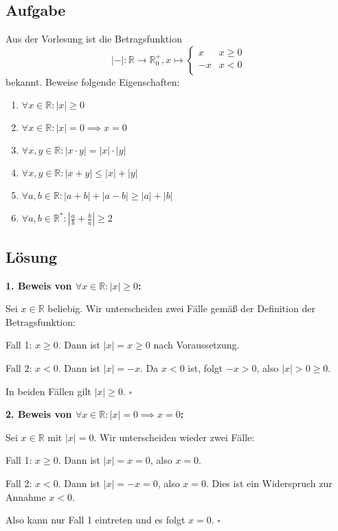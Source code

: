 \documentclass{article}
\newcommand{\abs}[1]{|#1|}
\newcommand{\R}{\mathbb{R}}
\newcommand{\fa}[1]{\forall #1 \colon}
\begin{document}
\subsection*{Aufgabe}
Aus der Vorlesung ist die Betragsfunktion 
\[
  \abs{{-}} \colon \R \to \R^{+}_{0}, x \mapsto
  \begin{cases}
    x  & x \geq 0 \\
    -x & x < 0    \\
  \end{cases}
\]
bekannt. Beweise folgende Eigenschaften:
\begin{enumerate}
\item \(\fa{x \in \mathbb{R}} \abs{x} \geq 0\)
\item \(\fa{x \in \R} \abs{x} = 0 \implies x = 0\)
\item \(\fa{x, y \in \R} \abs{x \cdot y} = \abs{x} \cdot \abs{y}\)
\item \(\fa{x, y \in \R} \abs{x + y} \leq \abs{x} + \abs{y}\)
\item \(\fa{a,b \in \R} \abs{a + b} + \abs{a - b} \geq \abs{a} + \abs{b}\)
\item \(\fa{a,b \in \R^*} \abs{\frac{a}{b} + \frac{b}{a}} \geq 2\)
\end{enumerate}

\subsection*{Lösung}

\textbf{1. Beweis von \(\fa{x \in \mathbb{R}} \abs{x} \geq 0\):}

Sei $x \in \R$ beliebig. Wir unterscheiden zwei Fälle gemäß der Definition der Betragsfunktion:

Fall 1: $x \geq 0$. Dann ist $\abs{x} = x \geq 0$ nach Voraussetzung.

Fall 2: $x < 0$. Dann ist $\abs{x} = -x$. Da $x < 0$ ist, folgt $-x > 0$, also $\abs{x} > 0 \geq 0$.

In beiden Fällen gilt $\abs{x} \geq 0$. $\square$

\textbf{2. Beweis von \(\fa{x \in \R} \abs{x} = 0 \implies x = 0\):}

Sei $x \in \R$ mit $\abs{x} = 0$. Wir unterscheiden wieder zwei Fälle:

Fall 1: $x \geq 0$. Dann ist $\abs{x} = x = 0$, also $x = 0$.

Fall 2: $x < 0$. Dann ist $\abs{x} = -x = 0$, also $x = 0$. Dies ist ein Widerspruch zur Annahme $x < 0$.

Also kann nur Fall 1 eintreten und es folgt $x = 0$. $\square$
\end{document}
